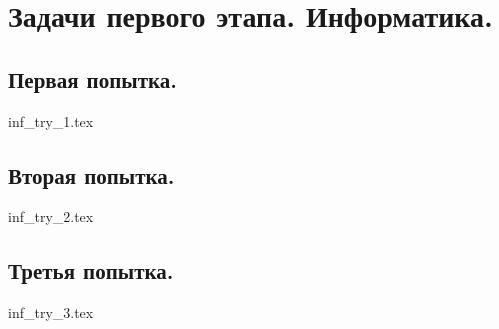 \chapter{Задачи первого этапа. Информатика.}

\section{Первая попытка.}

{inf_try_1.tex}

\section{Вторая попытка.}

{inf_try_2.tex}

\section{Третья попытка.}

{inf_try_3.tex}